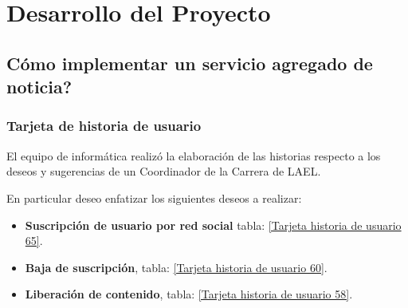 \chapter{Desarrollo del Proyecto}

\section{\textquestiondown Cómo implementar un servicio agregado de noticia?} \label{serviceFeed}

\subsection{Tarjeta de historia de usuario}

El equipo de informática realizó la elaboración de las historias respecto
a los deseos y sugerencias de un Coordinador de la Carrera de LAEL.

En particular deseo enfatizar los siguientes deseos a realizar:

\begin{itemize}

\item \textbf{Suscripción de usuario por red social} tabla: 
\ref{Tarjeta historia de usuario 65}.
\item \textbf{Baja de suscripción}, tabla: 
\ref{Tarjeta historia de usuario 60}.
\item \textbf{Liberación de contenido}, tabla: 
\ref{Tarjeta historia de usuario 58}.

\end{itemize}

